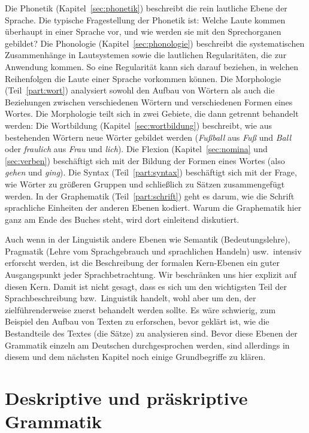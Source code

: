 Die Phonetik (Kapitel~\ref{sec:phonetik}) beschreibt die rein lautliche Ebene der Sprache.
Die typische Fragestellung der Phonetik ist:
Welche Laute kommen überhaupt in einer Sprache vor, und wie werden sie mit den Sprechorganen gebildet?
Die Phonologie (Kapitel~\ref{sec:phonologie}) beschreibt die systematischen Zusammenhänge in Lautsystemen sowie die lautlichen Regularitäten, die zur Anwendung kommen.
So eine Regularität kann sich \zB darauf beziehen, in welchen Reihenfolgen die Laute einer Sprache vorkommen können.
Die Morphologie (Teil~\ref{part:wort}) analysiert sowohl den Aufbau von Wörtern als auch die Beziehungen zwischen verschiedenen Wörtern und verschiedenen Formen eines Wortes.
Die Morphologie teilt sich in zwei Gebiete, die dann getrennt behandelt werden:
Die Wortbildung (Kapitel~\ref{sec:wortbildung}) beschreibt, wie aus bestehenden Wörtern neue Wörter gebildet werden (\zB \textit{Fußball} aus \textit{Fuß} und \textit{Ball} oder \textit{fraulich} aus \textit{Frau} und \textit{lich}).
Die Flexion (Kapitel~\ref{sec:nomina} und \ref{sec:verben}) beschäftigt sich mit der Bildung der Formen eines Wortes (also \zB \textit{gehen} und \textit{ging}). 
Die Syntax (Teil~\ref{part:syntax}) beschäftigt sich mit der Frage, wie Wörter zu größeren Gruppen und schließlich zu Sätzen zusammengefügt werden.
In der Graphematik (Teil~\ref{part:schrift}) geht es darum, wie die Schrift sprachliche Einheiten der anderen Ebenen kodiert.
Warum die Graphematik hier ganz am Ende des Buches steht, wird dort einleitend diskutiert.

Auch wenn in der Linguistik andere Ebenen wie Semantik (Bedeutungslehre), Pragmatik (Lehre vom Sprachgebrauch und sprachlichen Handeln) usw.\ intensiv erforscht werden, ist die Beschreibung der formalen Kern-Ebenen ein guter Ausgangspunkt jeder Sprachbetrachtung.
Wir beschränken uns hier explizit auf diesen Kern.
Damit ist nicht gesagt, dass es sich um den wichtigsten Teil der Sprachbeschreibung bzw.\ Linguistik handelt, wohl aber um den, der zielführenderweise zuerst behandelt werden sollte.
Es wäre schwierig, zum Beispiel den Aufbau von Texten zu erforschen, bevor geklärt ist, wie die Bestandteile des Textes (die Sätze) zu analysieren sind.
Bevor diese Ebenen der Grammatik einzeln am Deutschen durchgesprochen werden, sind allerdings in diesem und dem nächsten Kapitel noch einige Grundbegriffe zu klären.

\section{Deskriptive und präskriptive Grammatik}

